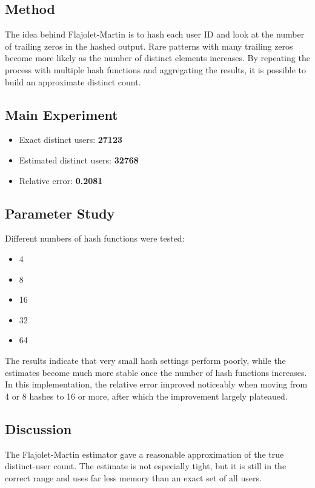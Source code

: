 \documentclass[11pt,a4paper]{article}
\begin{document}
\subsection*{Method}
The idea behind Flajolet-Martin is to hash each user ID and look at the number of trailing zeros in the hashed output. Rare patterns with many trailing zeros become more likely as the number of distinct elements increases. By repeating the process with multiple hash functions and aggregating the results, it is possible to build an approximate distinct count.

\subsection*{Main Experiment}
\begin{itemize}
    \item Exact distinct users: \textbf{27123}
    \item Estimated distinct users: \textbf{32768}
    \item Relative error: \textbf{0.2081}
\end{itemize}

\subsection*{Parameter Study}
Different numbers of hash functions were tested:
\begin{itemize}
    \item 4
    \item 8
    \item 16
    \item 32
    \item 64
\end{itemize}

The results indicate that very small hash settings perform poorly, while the estimates become much more stable once the number of hash functions increases. In this implementation, the relative error improved noticeably when moving from 4 or 8 hashes to 16 or more, after which the improvement largely plateaued.

\subsection*{Discussion}
The Flajolet-Martin estimator gave a reasonable approximation of the true distinct-user count. The estimate is not especially tight, but it is still in the correct range and uses far less memory than an exact set of all users.
\end{document}
